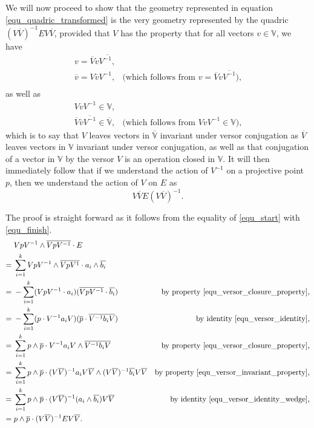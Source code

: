 \documentclass{birkjour}
\theoremstyle{definition}
\theoremstyle{remark}
\numberwithin{equation}{section}
\newcommand{\V}{\mathbb{V}}
\begin{document}
We will now proceed to show that the geometry represented in
equation \eqref{equ_quadric_transformed} is the very geometry
represented by the quadric $(V\overline{V})^{-1}EV\overline{V}$,
provided that $V$ has the property that for all vectors $v\in\V$,
we have
\begin{equation}\label{equ_versor_invariant_property}
\begin{array}{cl}
v=\overline{V}v\overline{V^{-1},} \\
\overline{v}=V\overline{v}V^{-1}, & \mbox{(which follows from $v=\overline{V}v\overline{V^{-1}}$),} \\
\end{array}
\end{equation}
as well as
\begin{equation}\label{equ_versor_closure_property}
\begin{array}{cl}
VvV^{-1}\in\V, \\
\overline{V}\overline{v}\overline{V^{-1}}\in\overline{\V}, & \mbox{(which follows from $VvV^{-1}\in\V$),}
\end{array}
\end{equation}
which is to say that $V$ leaves vectors in $\overline{\V}$ invariant under versor
conjugation as $\overline{V}$ leaves vectors in $\V$ invariant under versor conjugation,
as well as that conjugation of a vector in $\V$ by the versor $V$ is an operation closed in $\V$.
It will then immediately follow
that if we understand the action of $V^{-1}$ on a projective point $p$, then
we understand the action of $V$ on $E$ as
\begin{equation}
V\overline{V}E(V\overline{V})^{-1}.
\end{equation}

The proof is straight forward as it follows from the equality of \eqref{equ_start} with \eqref{equ_finish}.
{\allowdisplaybreaks
\begin{align}
 & VpV^{-1}\wedge\overline{VpV^{-1}}\cdot E\label{equ_start} \\
=\;& \sum_{i=1}^k VpV^{-1}\wedge\overline{VpV^{1}}\cdot a_i\wedge\overline{b_i} \\
=\;& -\sum_{i=1}^k (VpV^{-1}\cdot a_i)(\overline{VpV^{-1}}\cdot\overline{b_i}) & \mbox{by property \eqref{equ_versor_closure_property},} \\
=\;& -\sum_{i=1}^k (p\cdot V^{-1}a_iV)(\overline{p}\cdot\overline{V^{-1}b_iV}) & \mbox{by identity \eqref{equ_versor_identity},} \\
=\;& \sum_{i=1}^k p\wedge\overline{p}\cdot V^{-1}a_iV\wedge\overline{V^{-1}b_iV} &\mbox{by property \eqref{equ_versor_closure_property},} \\
=\;& \sum_{i=1}^k p\wedge\overline{p}\cdot (V\overline{V})^{-1}a_iV\overline{V}\wedge
(V\overline{V})^{-1}\overline{b_i}V\overline{V} &\mbox{by property \eqref{equ_versor_invariant_property},} \\
=\;& \sum_{i=1}^k p\wedge\overline{p}\cdot (V\overline{V})^{-1}(a_i\wedge\overline{b_i})V\overline{V} & \mbox{by identity \eqref{equ_versor_identity_wedge},} \\
=\;& p\wedge\overline{p}\cdot (V\overline{V})^{-1}EV\overline{V}.\label{equ_finish}
\end{align}}
\end{document}
